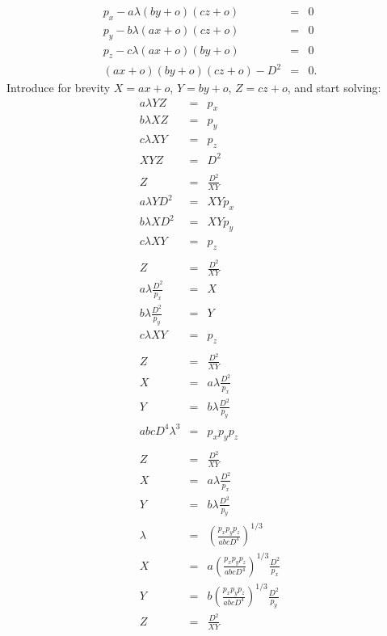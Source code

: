 \documentclass[12pt]{book}
\begin{document}
\begin{eqnarray*}
p_x - a\lambda(by+o)(cz+o) &=& 0\\
p_y - b\lambda(ax+o)(cz+o) &=& 0\\
p_z - c\lambda(ax+o)(by+o) &=& 0\\
(ax+o)(by+o)(cz+o)-D^2     &=& 0.
\end{eqnarray*}
Introduce for brevity $X=ax+o$, $Y=by+o$, $Z=cz+o$, and start solving:
\begin{eqnarray*}
a\lambda YZ &=& p_x \\
b\lambda XZ &=& p_y \\
c\lambda XY &=& p_z \\
XYZ         &=& D^2 \\
\\
Z             &=& \frac{D^2}{XY} \\
a\lambda YD^2 &=& XYp_x \\
b\lambda XD^2 &=& XYp_y \\
c\lambda XY   &=& p_z \\
\\
Z                        &=& \frac{D^2}{XY} \\
a\lambda \frac{D^2}{p_x}  &=& X \\
b\lambda \frac{D^2}{p_y}  &=& Y \\
c\lambda XY              &=& p_z \\
\\
Z                        &=& \frac{D^2}{XY} \\
X                        &=& a\lambda \frac{D^2}{p_x} \\
Y                        &=& b\lambda \frac{D^2}{p_y} \\
abcD^4\lambda^3          &=& p_xp_yp_z \\
\\
Z                        &=& \frac{D^2}{XY} \\
X                        &=& a\lambda \frac{D^2}{p_x} \\
Y                        &=& b\lambda \frac{D^2}{p_y} \\
\lambda                  &=& \left(\frac{p_xp_yp_z}{abcD^4}\right)^{1/3}
\\
X                        &=& a\left(\frac{p_xp_yp_z}{abcD^4}\right)^{1/3} \frac{D^2}{p_x} \\
Y                        &=& b\left(\frac{p_xp_yp_z}{abcD^4}\right)^{1/3} \frac{D^2}{p_y} \\
Z                        &=& \frac{D^2}{XY} \\

\end{eqnarray*}
\end{document}
